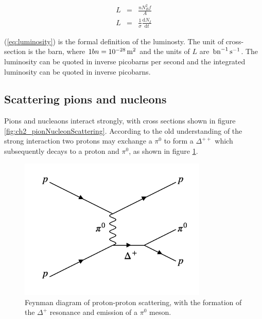 \begin{eqnarray}
  L & = & \frac{n N^2_B f}{A} \nonumber \\
  L & = & \frac{1}{\sigma}\frac{\mathrm{d}N_I}{\mathrm{d}t} \label{eq:luminosity}
\end{eqnarray}

(\ref{eq:luminosity}) is the formal definition of the luminosty.  The unit of cross-section is the barn, where $1 bn = 10^{-28}\mathrm{\,m}^2$ and the units of $L$ are $\mathrm{\,bn}^{-1}\mathrm{\,s}^{-1}$.  The luminosity can be quoted in inverse picobarns per second and the integrated luminosity can be quoted in inverse picobarns.

\subsection{Scattering pions and nucleons}

Pions and nucleaons interact strongly, with cross sections shown in figure \ref{fig:ch2_pionNucleonScattering}.  According to the old understanding of the strong interaction two protons may exchange a $\pi^0$ to form a $\Delta^{++}$ which subsequently decays to a proton and $\pi^0$, as shown in figure \ref{fig:ch2_PPToPPPi0}.

\begin{figure}[!htb]
  \begin{center}
    \includegraphics[width=0.8\textwidth]{images/web_feynman/image_8.png}
    \caption[Feynman diagram of proton-proton scattering]{Feynman diagram of proton-proton scattering, with the formation of the $\Delta^+$ resonance and emission of a $\pi^0$ meson.}
    \label{fig:ch2_PPToPPPi0}
  \end{center}
\end{figure}




